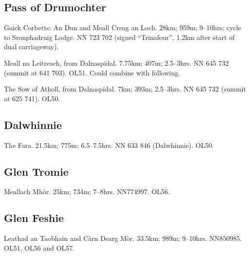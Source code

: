 
\subsection{Pass of Drumochter}
\begin{munros}
\item\target
Gaick Corbetts: An Dun and Meall Creag an Loch.  28km; 959m; 9--10hrs; cycle
to Sronphadruig Lodge.  NN 723 702 (signed ``Trinafour'', 1.2km after start of
dual carriageway).  \tick

\item
Meall na Leitreach, from Dalnaspidal.  7.75km; 407m; 2.5--3hrs.  NN 645 732
(summit at 641 703).  OL51.  Could combine with following. 

\item
The Sow of Atholl, from Dalnaspidal.  7km; 393m; 2.5--3hrs.  NN 645 732
(summit at 625 741).  OL50. 
\end{munros}


\subsection{Dalwhinnie}

\begin{munros}
\item\target
The Fara.  21.5km; 775m; 6.5--7.5hrs.  NN 633 846 (Dalwhinnie).  OL50.  \tick
\end{munros}


\subsection{Glen Tromie}

\begin{munros}
\item\target
Meallach Mhòr.  25km; 734m; 7--8hrs.  NN774997.  OL56. \tick
\end{munros}


\subsection{Glen Feshie}

\begin{munros}
\item\target
Leathad an Taobhain and Càrn Dearg Mòr.  33.5km; 989m; 9--10hrs.  NN850985.
OL51, OL56 and OL57.  \tick
\end{munros}

